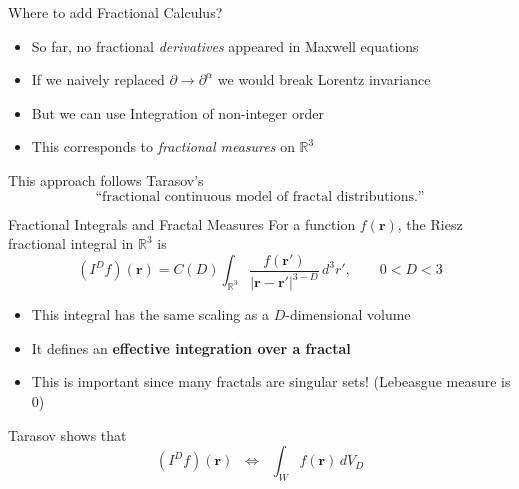 \documentclass[11pt]{beamer}
\begin{document}
\begin{frame}{Where to add Fractional Calculus?}
\begin{itemize}
  \item So far, no fractional \emph{derivatives} appeared in Maxwell equations
  \item If we naively replaced $\partial \rightarrow \partial^{\alpha}$ we would break Lorentz invariance
  \item But we can use Integration of non-integer order
  \item This corresponds to \emph{fractional measures} on $\mathbb{R}^3$
\end{itemize}

\vspace{0.2cm}
This approach follows Tarasov’s
\[
\text{``fractional continuous model of fractal distributions.''}
\]
\end{frame}


\begin{frame}{Fractional Integrals and Fractal Measures}
For a function $f(\bm r)$, the Riesz fractional integral in $\mathbb{R}^3$ is
\begin{equation*}
  (I^D f)(\bm r)
  =
  C(D)
  \int_{\mathbb{R}^3}
  \frac{f(\bm r')}{|\bm r - \bm r'|^{3-D}}
  \, d^3 r' ,
  \qquad 0 < D < 3
\end{equation*}

\begin{itemize}
  \item This integral has the same scaling as a $D$-dimensional volume
  \item It defines an \textbf{effective integration over a fractal}
  \item This is important since many fractals are singular sets! (Lebeasgue measure is 0)
\end{itemize}

\vspace{0.2cm}
Tarasov shows that
\[
  (I^D f)(\bm r)
  \;\;\Longleftrightarrow\;\;
  \int_W f(\bm r)\, dV_D
\]
\end{frame}
\end{document}
